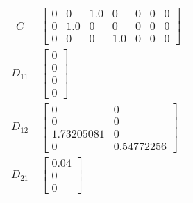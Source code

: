 \begin{tabular}{cl}
   $C$    & $\left[\begin{matrix}0 & 0 & 1.0 & 0 & 0 & 0 & 0\\0 & 1.0 & 0 & 0 & 0 & 0 & 0\\0 & 0 & 0 & 1.0 & 0 & 0 & 0\end{matrix}\right]$                                                                                                                                                         \\
 $D_{11}$ & $\left[\begin{matrix}0\\0\\0\\0\end{matrix}\right]$                                                                                                                                                                                                                                    \\
 $D_{12}$ & $\left[\begin{matrix}0 & 0\\0 & 0\\1.73205081 & 0\\0 & 0.54772256\end{matrix}\right]$                                                                                                                                                                                                  \\
 $D_{21}$ & $\left[\begin{matrix}0.04\\0\\0\end{matrix}\right]$                                                                                                                                                                                                                                    \\
\hline
\end{tabular}